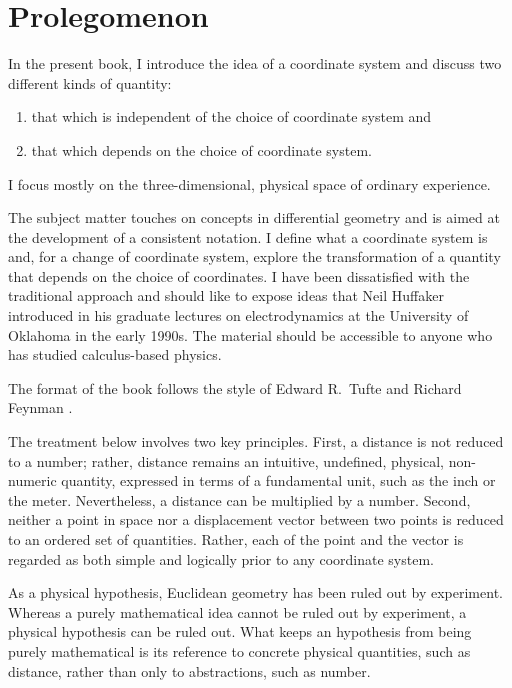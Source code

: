\cleardoublepage
\chapter*{Prolegomenon}

In the present book, I introduce the idea of a coordinate system and discuss
two different kinds of quantity:
\begin{enumerate}
   \item that which is independent of the choice of coordinate system and
   \item that which depends on the choice of coordinate system.
\end{enumerate}
I focus mostly on the three-dimensional, physical space of ordinary experience.

The subject matter touches on concepts in differential geometry and is aimed at
the development of a consistent notation.  I define what a coordinate system is
and, for a change of coordinate system, explore the transformation of a
quantity that depends on the choice of coordinates.  I have been dissatisfied
with the traditional approach and should like to expose ideas that Neil
Huffaker introduced in his graduate lectures on electrodynamics at the
University of Oklahoma in the early 1990s.  The material should be accessible
to anyone who has studied calculus-based physics.

The format of the book follows the style of Edward R.~Tufte and Richard
Feynman \citep{pkg-tufte}.

The treatment below involves two key principles.  First, a distance is not
reduced to a number; rather, distance remains an intuitive, undefined,
physical, non-numeric quantity, expressed in terms of a fundamental unit, such
as the inch or the meter.  Nevertheless, a distance can be multiplied by a
number.  Second, neither a point in space nor a displacement vector between two
points is reduced to an ordered set of quantities.  Rather, each of the point
and the vector is regarded as both simple and logically prior to any coordinate
system.

As a physical hypothesis, Euclidean geometry has been ruled out by
experiment.
Whereas a purely mathematical idea cannot be ruled out by experiment, a
physical hypothesis can be ruled out.  What keeps an hypothesis from being
purely mathematical is its reference to concrete physical quantities, such as
distance, rather than only to abstractions, such as number.

